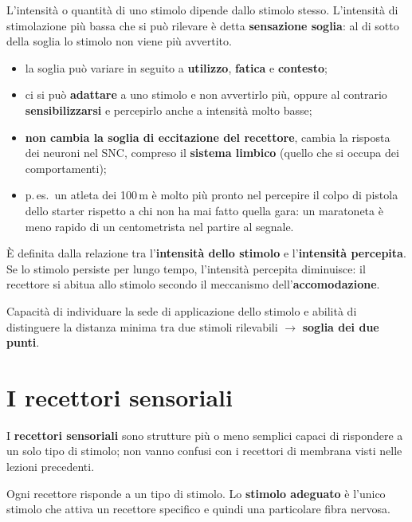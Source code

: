L'intensità o quantità di uno stimolo dipende dallo stimolo stesso. L'intensità di stimolazione
più bassa che si può rilevare è detta \textbf{sensazione soglia}: al di sotto della soglia lo
stimolo non viene più avvertito.
\begin{itemize}
  \item la soglia può variare in seguito a \textbf{utilizzo}, \textbf{fatica} e \textbf{contesto};
  \item ci si può \textbf{adattare} a uno stimolo e non avvertirlo più, oppure al contrario
    \textbf{sensibilizzarsi} e percepirlo anche a intensità molto basse;
  \item \textbf{non cambia la soglia di eccitazione del recettore}, cambia la risposta dei neuroni
    nel SNC, compreso il \textbf{sistema limbico} (quello che si occupa dei comportamenti);
  \item p.\,es.\ un atleta dei 100\,m è molto più pronto nel percepire il colpo di pistola dello
    starter rispetto a chi non ha mai fatto quella gara: un maratoneta è meno rapido di un
    centometrista nel partire al segnale.
\end{itemize}

È definita dalla relazione tra l'\textbf{intensità dello stimolo} e l'\textbf{intensità
percepita}. Se lo stimolo persiste per lungo tempo, l'intensità percepita diminuisce: il recettore
si abitua allo stimolo secondo il meccanismo dell'\textbf{accomodazione}.

Capacità di individuare la sede di applicazione dello stimolo e abilità di distinguere la distanza
minima tra due stimoli rilevabili $\rightarrow$ \textbf{soglia dei due punti}.

\section{I recettori sensoriali}

I \textbf{recettori sensoriali} sono strutture più o meno semplici capaci di rispondere a un solo
tipo di stimolo; non vanno confusi con i recettori di membrana visti nelle lezioni precedenti.

Ogni recettore risponde a un tipo di stimolo. Lo \textbf{stimolo adeguato} è l'unico stimolo che
attiva un recettore specifico e quindi una particolare fibra nervosa.


